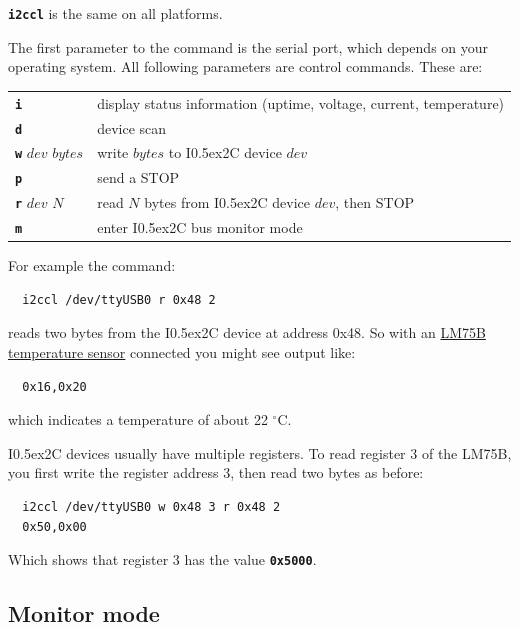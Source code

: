 \documentclass{article}
\newcommand{\two}{\raise0.5ex\hbox{\footnotesize{2}}}
\newcommand{\iic}{I\two{}C}
\newcommand{\degc}{$^{\circ}$C}
\newcommand{\mach}[1]{\texttt{\textbf{#1}}}
\newcommand{\gap}{\vspace{10pt}}
\begin{document}
\mach{i2ccl} is the same on all platforms.

The first parameter to the command is the serial port, which depends on your operating system.
All following parameters are control commands. These are:

\begin{tabular}{ll}
  \mach{i}               & display status information (uptime, voltage, current, temperature) \\
  \mach{d}               & device scan \index{bus scan} \\
  \mach{w} $dev$ $bytes$ & write $bytes$ to \iic{} device $dev$ \\
  \mach{p}               & send a STOP \\
  \mach{r} $dev$ $N$     & read $N$ bytes from \iic{} device $dev$, then STOP \\
  \mach{m}               & enter \iic{} bus monitor mode \\
\end{tabular}\gap

For example the command:

\begin{lstlisting}
  i2ccl /dev/ttyUSB0 r 0x48 2
\end{lstlisting}

reads two bytes from the \iic{} device at address 0x48.
So with an
\href{https://www.nxp.com/docs/en/data-sheet/LM75B.pdf}{LM75B temperature sensor}
connected you might see output like:

\begin{lstlisting}
  0x16,0x20
\end{lstlisting}

which indicates a temperature of about 22 \degc.

\iic{} devices usually have multiple registers. 
To read register 3 of the LM75B, you first write the register address 3, then read two bytes as before:

\begin{lstlisting}
  i2ccl /dev/ttyUSB0 w 0x48 3 r 0x48 2
  0x50,0x00
\end{lstlisting}

Which shows that register 3 has the value \mach{0x5000}.

\subsection{Monitor mode}
\end{document}
